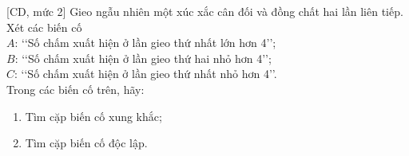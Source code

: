 \begin{bt}%
[CD, mức 2]%
	Gieo ngẫu nhiên một xúc xắc cân đối và đồng chất hai lần liên tiếp. Xét các biến cố\\
	$A$: \lq\lq Số chấm xuất hiện ở lần gieo thứ nhất lớn hơn 4\rq\rq ;\\
	$B$: \lq\lq Số chấm xuất hiện ở lần gieo thứ hai nhỏ hơn 4\rq\rq ;\\
	$C$: \lq\lq Số chấm xuất hiện ở lần gieo thứ nhất nhỏ hơn 4\rq\rq.\\
	Trong các biến cố trên, hãy:
	\begin{enumerate}
		\item Tìm cặp biến cố xung khắc;
		\item Tìm cặp biến cố độc lập.
	\end{enumerate}
\end{bt}

